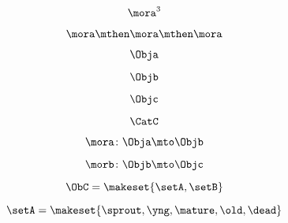 \begin{forslides}
        
         \begin{equation}
            \label{eq:semicats-slides-69}
            \mora^3
        \end{equation}
        
        
         \begin{equation}
            \label{eq:semicats-slides-70}
            \mora \mthen \mora \mthen \mora
        \end{equation}
        
        
         \begin{equation}
            \label{eq:semicats-slides-71}
            \Obja
        \end{equation}
        
        
         \begin{equation}
            \label{eq:semicats-slides-72}
            \Objb
        \end{equation}
        
        
         \begin{equation}
            \label{eq:semicats-slides-73}
            \Objc
        \end{equation}
        
        
         \begin{equation}
            \label{eq:semicats-slides-74}
            \CatC
        \end{equation}
        
        
         \begin{equation}
            \label{eq:semicats-slides-75}
            \mora\colon \Obja \mto \Objb
        \end{equation}
        
        
               \begin{equation}
            \label{eq:semicats-slides-76}
            \morb\colon \Objb \mto \Objc
        \end{equation}
        
        
         \begin{equation}
            \label{eq:semicats-slides-77}
            \ObC = \makeset{ \setA, \setB }
        \end{equation}
        
        
         \begin{equation}
            \label{eq:semicats-slides-78}
            \setA = \makeset{ \sprout, \yng, \mature, \old, \dead }
        \end{equation}
        

\end{forslides}
